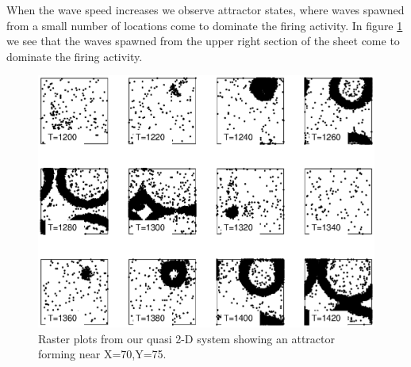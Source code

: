 When the wave speed increases we observe attractor states, where waves spawned from a small number of locations come to dominate the firing activity.
In figure \ref{fig:2DWaveRasters_attractor} we see that the waves spawned from the upper right section of the sheet come to dominate the firing activity.
\begin{figure}[!htb]
 \caption{ Raster plots from our quasi 2-D system showing an attractor forming near X=70,Y=75.}
 \label{fig:2DWaveRasters_attractor}
 \centering
   \includegraphics[width=\textwidth]{fig/2DWaveRasters_Attractor_kappa0p1_seed35}
\end{figure}

